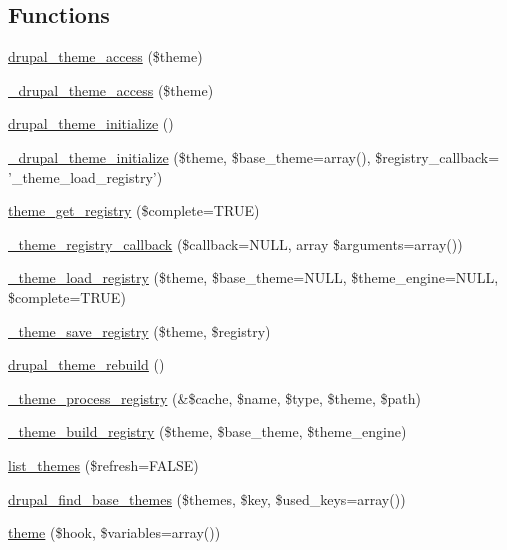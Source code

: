 \subsection*{Functions}
\begin{DoxyCompactItemize}
\item 
\hyperlink{includes_2theme_8inc_a8585432498ca31ecec1292096a0dce3e}{drupal\_\-theme\_\-access} (\$theme)
\item 
\hyperlink{includes_2theme_8inc_a0cdacdc488fa9d7d67b2e7a8c20b9ecc}{\_\-drupal\_\-theme\_\-access} (\$theme)
\item 
\hyperlink{includes_2theme_8inc_a9e48961b3be3ca78f434b047fbb8463f}{drupal\_\-theme\_\-initialize} ()
\item 
\hyperlink{includes_2theme_8inc_a3fe8f5fcec2fa4c93ee68b59beac38c9}{\_\-drupal\_\-theme\_\-initialize} (\$theme, \$base\_\-theme=array(), \$registry\_\-callback= '\_\-theme\_\-load\_\-registry')
\item 
\hyperlink{includes_2theme_8inc_ae532c57b7a0288c1a359da1e2a70a0b1}{theme\_\-get\_\-registry} (\$complete=TRUE)
\item 
\hyperlink{includes_2theme_8inc_a7b2a2d8890b8af591d8f7760fb56ab02}{\_\-theme\_\-registry\_\-callback} (\$callback=NULL, array \$arguments=array())
\item 
\hyperlink{includes_2theme_8inc_a67aaff43a866a3e65962408f323de8eb}{\_\-theme\_\-load\_\-registry} (\$theme, \$base\_\-theme=NULL, \$theme\_\-engine=NULL, \$complete=TRUE)
\item 
\hyperlink{includes_2theme_8inc_aa74b1ecea2de39ca0413a1a661167d39}{\_\-theme\_\-save\_\-registry} (\$theme, \$registry)
\item 
\hyperlink{includes_2theme_8inc_a39fec3ccb5c90369be7b5df7961d47ed}{drupal\_\-theme\_\-rebuild} ()
\item 
\hyperlink{includes_2theme_8inc_a473fae348447b091f0d8e677820d30c3}{\_\-theme\_\-process\_\-registry} (\&\$cache, \$name, \$type, \$theme, \$path)
\item 
\hyperlink{includes_2theme_8inc_a4a1f9a033ff57b119d18697763909f3d}{\_\-theme\_\-build\_\-registry} (\$theme, \$base\_\-theme, \$theme\_\-engine)
\item 
\hyperlink{includes_2theme_8inc_a48d5521b10139d745626435d804353a4}{list\_\-themes} (\$refresh=FALSE)
\item 
\hyperlink{includes_2theme_8inc_ab9b1b3016f42a43d21096d650ffe7ec1}{drupal\_\-find\_\-base\_\-themes} (\$themes, \$key, \$used\_\-keys=array())
\item 
\hyperlink{includes_2theme_8inc_a7c25609a935874541a19657affd30fff}{theme} (\$hook, \$variables=array())

\end{DoxyCompactItemize}
